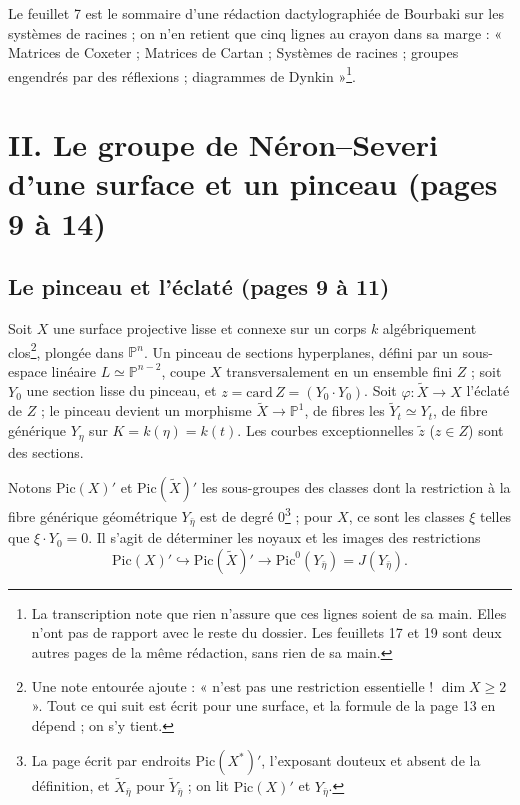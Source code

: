 \documentclass[11pt,a4paper]{article}
\begin{document}
Le feuillet 7 est le sommaire d'une rédaction dactylographiée de Bourbaki
sur les systèmes de racines ; on n'en retient que cinq lignes au crayon
dans sa marge : « Matrices de Coxeter ; Matrices de Cartan ; Systèmes de
racines ; groupes engendrés par des réflexions ; diagrammes de
Dynkin »\footnote{La transcription note que rien n'assure que ces lignes
soient de sa main. Elles n'ont pas de rapport avec le reste du dossier.
Les feuillets 17 et 19 sont deux autres pages de la même rédaction, sans
rien de sa main.}.

\section*{II. Le groupe de Néron–Severi d'une surface et un pinceau (pages 9 à 14)}

\subsection*{Le pinceau et l'éclaté (pages 9 à 11)}

Soit $X$ une surface projective lisse et connexe sur un corps $k$
algébriquement clos\footnote{Une note entourée ajoute : « n'est pas une
restriction essentielle ! $\dim X \geqslant 2$ ». Tout ce qui suit est écrit
pour une surface, et la formule de la page 13 en dépend ; on s'y tient.},
plongée dans $\mathbb{P}^n$. Un pinceau de sections hyperplanes, défini par
un sous-espace linéaire $L \simeq \mathbb{P}^{n-2}$, coupe $X$
transversalement en un ensemble fini $Z$ ; soit $Y_0$ une section lisse du
pinceau, et $z = \mathrm{card}\, Z = (Y_0 \cdot Y_0)$. Soit
$\varphi : \tilde X \to X$ l'éclaté de $Z$ ; le pinceau devient un morphisme
$\tilde X \to \mathbb{P}^1$, de fibres les $\tilde Y_t \simeq Y_t$, de fibre
générique $Y_\eta$ sur $K = k(\eta) = k(t)$. Les courbes exceptionnelles
$\tilde z$ ($z \in Z$) sont des sections.

Notons $\mathrm{Pic}(X)'$ et $\mathrm{Pic}(\tilde X)'$ les sous-groupes des
classes dont la restriction à la fibre générique géométrique
$Y_{\bar\eta}$ est de degré $0$\footnote{La page écrit par endroits
$\mathrm{Pic}(X^*)'$, l'exposant douteux et absent de la définition, et
$\tilde X_{\bar\eta}$ pour $\tilde Y_{\bar\eta}$ ; on lit $\mathrm{Pic}(X)'$
et $Y_{\bar\eta}$.} ; pour $X$, ce sont les classes $\xi$ telles que
$\xi \cdot Y_0 = 0$. Il s'agit de déterminer les noyaux et les images des
restrictions
\[
  \mathrm{Pic}(X)' \hookrightarrow \mathrm{Pic}(\tilde X)'
  \longrightarrow \mathrm{Pic}^0(Y_{\bar\eta}) = J(Y_{\bar\eta}).
\]
\end{document}
